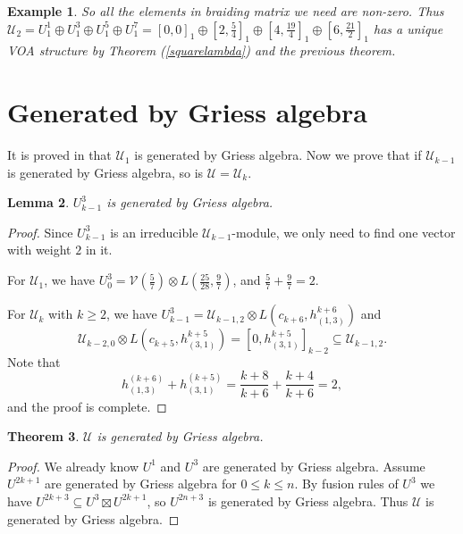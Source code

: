 \documentclass{article}
\newtheorem{lemma}{Lemma}[section]
\newtheorem{theorem}[lemma]{Theorem}
\newtheorem{example}[lemma]{Example}
\begin{document}
\begin{example}

So all the elements in braiding matrix we need are non-zero. 
Thus $\mathcal{U}_2=U_1^1\oplus U_1^3\oplus U_1^5\oplus U_1^7=
\left[0,0\right]_1\oplus\left[2,\frac{5}{4}\right]_1
\oplus\left[4,\frac{19}{4}\right]_1\oplus\left[6,\frac{21}{2}\right]_1$
has a unique VOA structure
by Theorem (\ref{squarelambda}) and the previous theorem.
\end{example}

\section{Generated by Griess algebra}
It is proved in \cite{JZ} that $\mathcal{U}_1$ is generated by Griess algebra.
Now we prove that if $\mathcal{U}_{k-1}$ is generated by Griess algebra, so is $\mathcal{U}=\mathcal{U}_k$.
\begin{lemma}
$U^3_{k-1}$ is generated by Griess algebra.
\end{lemma}
\begin{proof}
Since $U^3_{k-1}$ is an irreducible $\mathcal{U}_{k-1}$-module,
we only need to find one vector with weight $2$ in it.

For $\mathcal{U}_1$, 
we have $U^{3}_0=\mathcal{V}(\frac{5}{7})\otimes L(\frac{25}{28},\frac{9}{7})$,
and $\frac{5}{7}+\frac{9}{7}=2.$

For $\mathcal{U}_k$ with $k\geq 2$, we have
$U^3_{k-1}=\mathcal{U}_{k-1,2}\otimes L\left(c_{k+6},h_{(1,3)}^{k+6}\right)$
and 
$$\mathcal{U}_{k-2,0}
\otimes L\left(c_{k+5},h_{(3,1)}^{k+5}\right)
=\left[0,h_{(3,1)}^{k+5}\right]_{k-2}\subseteq \mathcal{U}_{k-1,2}.$$
Note that
$$
h^{(k+6)}_{(1,3)}+ h^{(k+5)}_{(3,1)}=\frac{k+8}{k+6}+\frac{k+4}{k+6}=2,
$$
and the proof is complete.
\end{proof}

\begin{theorem}
$\mathcal{U}$ is generated by Griess algebra.
\end{theorem}
\begin{proof}
We already know $U^1$ and $U^3$ are generated by Griess algebra.
Assume $U^{2k+1}$ are generated by Griess algebra for $0\leq k\leq n$.
By fusion rules of $U^3$ we have $U^{2k+3}\subseteq U^3\boxtimes U^{2k+1}$,
so $U^{2n+3}$ is generated by Griess algebra.
Thus $\mathcal{U}$ is generated by Griess algebra.
\end{proof}
\end{document}

